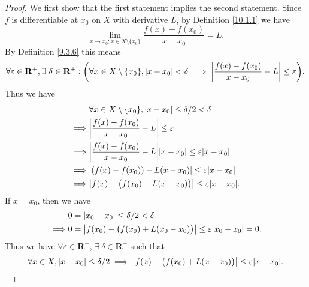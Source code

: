 \begin{proof}
    We first show that the first statement implies the second statement.
    Since \(f\) is differentiable at \(x_0\) on \(X\) with derivative \(L\), by Definition \ref{10.1.1} we have
    \[
        \lim_{x \to x_0 ; x \in X \setminus \{x_0\}} \frac{f(x) - f(x_0)}{x - x_0} = L.
    \]
    By Definition \ref{9.3.6} this means
    \[
        \forall \varepsilon \in \mathbf{R}^+, \exists\ \delta \in \mathbf{R}^+ : \bigg(\forall x \in X \setminus \{x_0\}, \abs*{x - x_0} < \delta \implies \abs*{\frac{f(x) - f(x_0)}{x - x_0} - L} \leq \varepsilon\bigg).
    \]
    Thus we have
    \begin{align*}
                 & \forall x \in X \setminus \{x_0\}, \abs*{x - x_0} \leq \delta / 2 < \delta              \\
        \implies & \abs*{\frac{f(x) - f(x_0)}{x - x_0} - L} \leq \varepsilon                               \\
        \implies & \abs*{\frac{f(x) - f(x_0)}{x - x_0} - L} \abs*{x - x_0} \leq \varepsilon \abs*{x - x_0} \\
        \implies & \abs*{(f(x) - f(x_0)) - L(x - x_0)} \leq \varepsilon \abs*{x - x_0}                     \\
        \implies & \abs*{f(x) - \big(f(x_0) + L(x - x_0)\big)} \leq \varepsilon \abs*{x - x_0}.
    \end{align*}
    If \(x = x_0\), then we have
    \begin{align*}
                 & 0 = \abs*{x_0 - x_0} \leq \delta / 2 < \delta                                              \\
        \implies & 0 = \abs*{f(x_0) - \big(f(x_0) + L(x_0 - x_0)\big)} \leq \varepsilon \abs*{x_0 - x_0} = 0.
    \end{align*}
    Thus we have \(\forall \varepsilon \in \mathbf{R}^+\), \(\exists\ \delta \in \mathbf{R}^+\) such that
    \[
        \forall x \in X, \abs*{x - x_0} \leq \delta / 2 \implies \abs*{f(x) - \big(f(x_0) + L(x - x_0)\big)} \leq \varepsilon \abs*{x - x_0}.
    \]


\end{proof}
